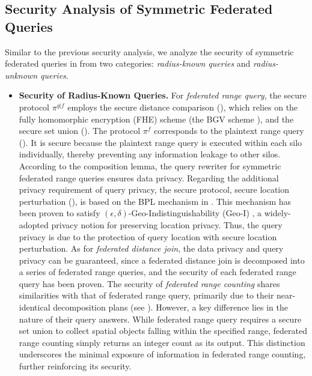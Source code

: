 \subsection{Security Analysis of Symmetric Federated Queries}\label{app:secure-symm}

Similar to the previous security analysis, we analyze the security of symmetric federated queries in \sysname from two categories: \textit{radius-known queries} and \textit{radius-unknown queries}. 

\begin{itemize}
    \item \textbf{Security of Radius-Known Queries.} 
    For \textit{federated range query}, the secure protocol $\pi^{g|f}$ employs the secure distance comparison (), which relies on the fully homomorphic encryption (FHE) scheme (\ie the BGV scheme \cite{DBLP:journals/csur/AcarAUC18}), and the secure set union ().
    The protocol $\pi^f$ corresponds to the plaintext range query ().
    It is secure because the plaintext range query is executed within each silo individually, thereby preventing any information leakage to other silos.
    According to the composition lemma, the query rewriter for symmetric federated range queries ensures data privacy.
    Regarding the additional privacy requirement of query privacy, the secure protocol, secure location perturbation (), is based on the BPL mechanism in \cite{DBLP:journals/corr/abs-2312-12012}.
    This mechanism has been proven to satisfy $(\epsilon,\delta)$-Geo-Indistinguishability (Geo-I) \cite{DBLP:conf/ccs/AndresBCP13}, a widely-adopted privacy notion for preserving location privacy.
    Thus, the query privacy is due to the protection of query location with secure location perturbation.
    As for \textit{federated distance join}, the data privacy and query privacy can be guaranteed, since a federated distance join is decomposed into a series of federated range queries, and the security of each federated range query has been proven.
    The security of \textit{federated range counting} shares similarities with that of federated range query, primarily due to their near-identical decomposition plans (see ).
    However, a key difference lies in the nature of their query answers. 
    While federated range query requires a secure set union to collect spatial objects falling within the specified range, federated range counting simply returns an integer count as its output. 
    This distinction underscores the minimal exposure of information in federated range counting, further reinforcing its security.
    

\end{itemize}
